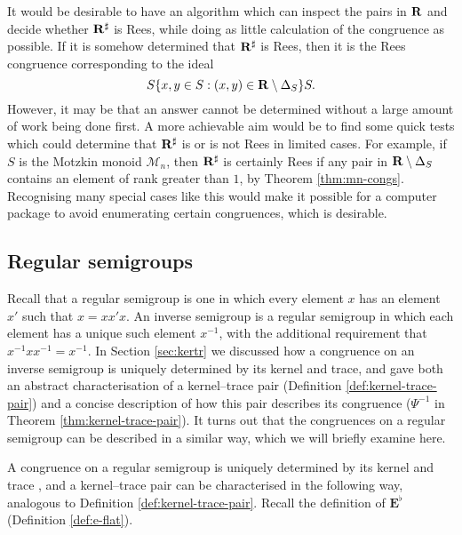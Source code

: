 It would be desirable to have an algorithm which can inspect the pairs in $\mathbf{R}$
and decide whether $\mathbf{R}^\sharp$ is Rees, while doing as little calculation of the
congruence as possible.  If it is somehow determined that $\mathbf{R}^\sharp$ is Rees, then it
is the Rees congruence corresponding to the ideal
$$S\{x,y \in S : (x,y) \in \mathbf{R} \setminus \Delta_S\}S.$$
However, it may be that an answer cannot be determined without a large amount of
work being done first.  A more achievable aim would be to find some quick tests
which could determine that $\mathbf{R}^\sharp$ is or is not Rees in limited cases.  For
example, if $S$ is the Motzkin monoid $\mathcal{M}_n$, then $\mathbf{R}^\sharp$ is certainly
Rees if any pair in $\mathbf{R} \setminus \Delta_S$ contains an element of rank greater
than $1$, by Theorem \ref{thm:mn-congs}.  Recognising many special cases
like this would make it possible for a computer package to avoid enumerating
certain congruences, which is desirable.

\subsection{Regular semigroups}
\label{sec:converting-regular}
Recall that a regular semigroup  is one in which every
element $x$ has an element $x'$ such that $x = xx'x$.  An inverse semigroup is a
regular semigroup in which each element has a unique such element $x^{-1}$, with
the additional requirement that $x^{-1}xx^{-1}=x^{-1}$.  In Section
\ref{sec:kertr} we discussed how a congruence on an inverse semigroup is
uniquely determined by its kernel and trace, and gave both an abstract
characterisation of a kernel--trace pair (Definition
\ref{def:kernel-trace-pair}) and a concise description of how this pair
describes its congruence ($\Psi^{-1}$ in Theorem \ref{thm:kernel-trace-pair}).
It turns out that the congruences on a regular semigroup can be described in a
similar way, which we will briefly examine here.

A congruence on a regular semigroup is uniquely determined by its kernel and
trace \cite[Corollary 2.11]{pastijn_1986}, and a kernel--trace pair can be
characterised in the following way, analogous to Definition
\ref{def:kernel-trace-pair}.  Recall the definition of $\mathbf{E}^\flat$
(Definition \ref{def:e-flat}).

